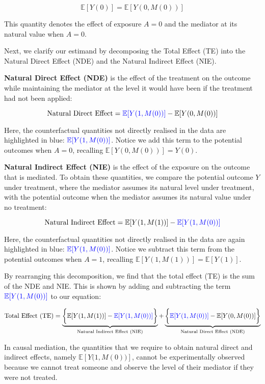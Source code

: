 \documentclass[
  single column]{article}
\begin{document}
\[ 
\mathbb{E}[Y(0)] = \mathbb{E}[Y(0, M(0))]
\]

This quantity denotes the effect of exposure \(A = 0\) and the mediator
at its natural value when \(A = 0\).

Next, we clarify our estimand by decomposing the Total Effect (TE) into
the Natural Direct Effect (NDE) and the Natural Indirect Effect (NIE).

\textbf{Natural Direct Effect (NDE)} is the effect of the treatment on
the outcome while maintaining the mediator at the level it would have
been if the treatment had not been applied:

\[
\text{Natural Direct Effect} = \textcolor{blue}{\mathbb{E}[Y(1, M(0))]} - \mathbb{E}[Y(0, M(0))]
\]

Here, the counterfactual quantities not directly realised in the data
are highlighted in blue: \(\textcolor{blue}{\mathbb{E}[Y(1, M(0))]}\).
Notice we add this term to the potential outcomes when \(A = 0\),
recalling \(\mathbb{E}[Y(0, M(0))] = Y(0)\).

\textbf{Natural Indirect Effect (NIE)} is the effect of the exposure on
the outcome that is mediated. To obtain these quantities, we compare the
potential outcome \(Y\) under treatment, where the mediator assumes its
natural level under treatment, with the potential outcome when the
mediator assumes its natural value under no treatment:

\[
\text{Natural Indirect Effect} = \mathbb{E}[Y(1, M(1))] - \textcolor{blue}{\mathbb{E}[Y(1, M(0))]}
\]

Here, the counterfactual quantities not directly realised in the data
are again highlighted in blue:
\(\textcolor{blue}{\mathbb{E}[Y(1, M(0))]}\). Notice we subtract this
term from the potential outcomes when \(A = 1\), recalling
\(\mathbb{E}[Y(1, M(1))] = \mathbb{E}[Y(1)]\).

By rearranging this decomposition, we find that the total effect (TE) is
the sum of the NDE and NIE. This is shown by adding and subtracting the
term \(\textcolor{blue}{\mathbb{E}[Y(1, M(0))]}\) to our equation:

\[
\text{Total Effect (TE)} = \underbrace{\bigg\{\mathbb{E}[Y(1, M(1))] - \textcolor{blue}{\mathbb{E}[Y(1, M(0))]}\bigg\}}_{\text{Natural Indirect Effect (NIE)}} + \underbrace{\bigg\{\textcolor{blue}{\mathbb{E}[Y(1, M(0))]} - \mathbb{E}[Y(0, M(0))]\bigg\}}_{\text{Natural Direct Effect (NDE)}}
\]

\begin{table}

\caption{\label{tbl-mediationpuzzle}In causal mediation, the quantities
that we require to obtain natural direct and indirect effects, namely
\(\mathbb{E}[Y\big(1,M(0)\big)]\), cannot be experimentally observed
because we cannot treat someone and observe the level of their mediator
if they were not treated.}

\centering{

\mediationpuzzle

}

\end{table}%
\end{document}
